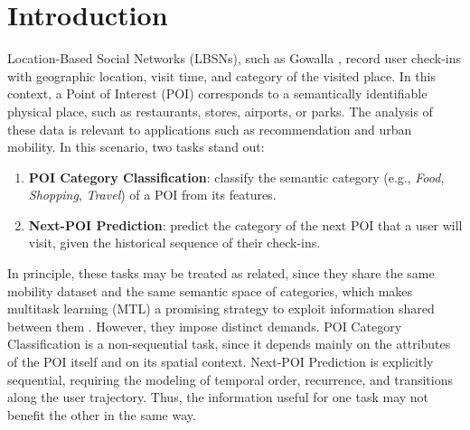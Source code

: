 \section{Introduction}
\label{sec:courb:intro}

Location-Based Social Networks (LBSNs), such as Gowalla \cite{cho2011gowalla,jure2014snap}, record user check-ins with geographic location, visit time, and category of the visited place. In this context, a Point of Interest (POI) corresponds to a semantically identifiable physical place, such as restaurants, stores, airports, or parks. The analysis of these data is relevant to applications such as recommendation and urban mobility. In this scenario, two tasks stand out:

\begin{enumerate}
    \item \textbf{POI Category Classification}: classify the semantic category (e.g., \textit{Food}, \textit{Shopping}, \textit{Travel}) of a POI from its features.
    \item \textbf{Next-POI Prediction}: predict the category of the next POI that a user will visit, given the historical sequence of their check-ins.
\end{enumerate}

In principle, these tasks may be treated as related, since they share the same mobility dataset and the same semantic space of categories, which makes multitask learning (MTL) a promising strategy to exploit information shared between them \cite{caruana1997multitask}. However, they impose distinct demands. POI Category Classification is a non-sequential task, since it depends mainly on the attributes of the POI itself and on its spatial context. Next-POI Prediction is explicitly sequential, requiring the modeling of temporal order, recurrence, and transitions along the user trajectory. Thus, the information useful for one task may not benefit the other in the same way.

